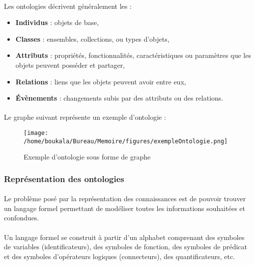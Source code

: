 \documentclass[12pt, a4paper, oneside]{book}
\begin{document}
\paragraph{}
Les ontologies décrivent généralement les :
\begin{itemize}
\item \textbf{Individus} : objets de base,
\item \textbf{Classes} : ensembles, collections, ou types d'objets,
\item \textbf{Attributs} : propriétés, fonctionnalités, caractéristiques ou paramètres que les objets peuvent posséder et partager,
\item \textbf{Relations} : liens que les objets peuvent avoir entre eux,
\item \textbf{Évènements} : changements subis par des attributs ou des relations.
\end{itemize}

\paragraph{}
Le graphe suivant représente un exemple d’ontologie :

\begin{figure}[h!]
\begin{center}
\texttt{[image: /home/boukala/Bureau/Memoire/figures/exempleOntologie.png]}
\caption{Exemple d'ontologie sous forme de graphe}
\end{center}
\end{figure}






\subsubsection{Représentation des ontologies}
\paragraph{}
Le problème posé par la représentation des connaissances est de pouvoir trouver un langage formel permettant de modéliser toutes les informations souhaitées et confondues.
\paragraph{}
Un langage formel se construit à partir d'un alphabet comprenant des symboles de variables (identificateurs), des symboles de fonction, des symboles de prédicat et des symboles d'opérateurs logiques (connecteurs), des quantificateurs, etc.
\end{document}
